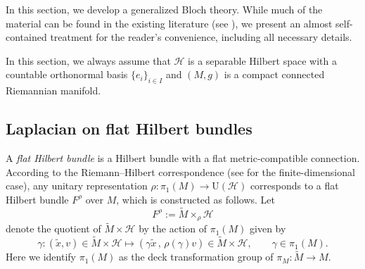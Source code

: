 \documentclass[11pt,oneside,reqno]{amsart}
\theoremstyle{definition}
\numberwithin{equation}{section}
\theoremstyle{plain}
\begin{document}
In this section, we develop a generalized Bloch theory. While much of the material can be found in the existing literature (see \cite{nagy2024hyperbolic, kocabova2008generalized}), we present an almost self-contained treatment for the reader’s convenience, including all necessary details.

In this section, we always assume that $\mathcal{H}$ is a separable Hilbert space with a countable orthonormal basis $\{e_{i}\}_{i\in I}$ and $(M,g)$ is a compact connected Riemannian manifold.


\subsection{Laplacian on flat Hilbert bundles}\label{subsec: twisted laplacian}

A \emph{flat Hilbert bundle} is a Hilbert bundle with a flat metric-compatible connection. According to the Riemann–Hilbert correspondence (see \cite[Section 1.2-1.4]{Kobayashi87vectorbundle} for the finite-dimensional case), any unitary representation $\rho: \pi_{1}(M) \to \mathrm{U}(\mathcal{H})$ corresponds to a flat Hilbert bundle $F^\rho$ over $M$, which is constructed as follows. Let
\begin{equation}\label{defFrho}
    F^\rho:=\widetilde{M} \times_{\rho} \mathcal{H}
\end{equation}
denote the quotient of $\widetilde{M} \times \mathcal{H}$ by the action of $\pi_1(M)$ given by
\begin{equation}\label{defofflatbundle}
    \gamma: (\widetilde{x},v) \in \widetilde{M}\times \mathcal{H} \mapsto (\gamma \widetilde{x}\,,\,\rho(\gamma )v) \in \widetilde{M}\times \mathcal{H} , \qquad \gamma \in \pi_1(M).
\end{equation}
Here we identify $\pi_1(M)$ as the deck transformation group of $\pi_M:\widetilde{M}\to M$. 
\end{document}
